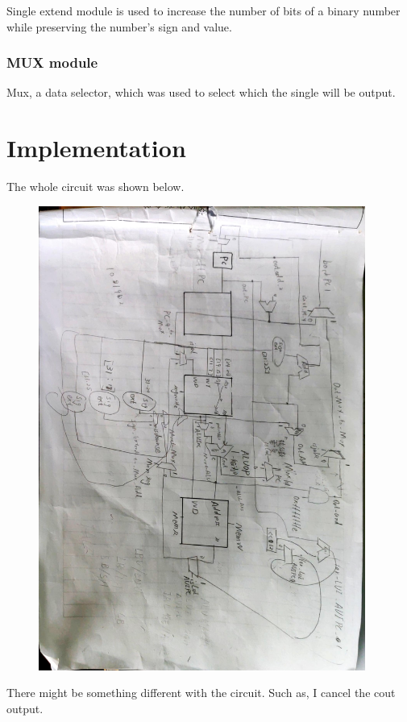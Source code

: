 \documentclass[12pt,a4paper]{article}
\begin{document}
Single extend module is used to increase the number of bits of a binary number while preserving the number's sign and value. 

\subsubsection{MUX module}

Mux, a data selector, which was used to select which the single will be output.

\newpage

\section{Implementation}

The whole circuit was shown below.

\begin{figure}[H]
  \centering
  \includegraphics[height=6in, angle=90]{Lens.jpg}
  \end{figure}

There might be something different with the circuit.
Such as, I cancel the cout output.
\newpage
\end{document}
